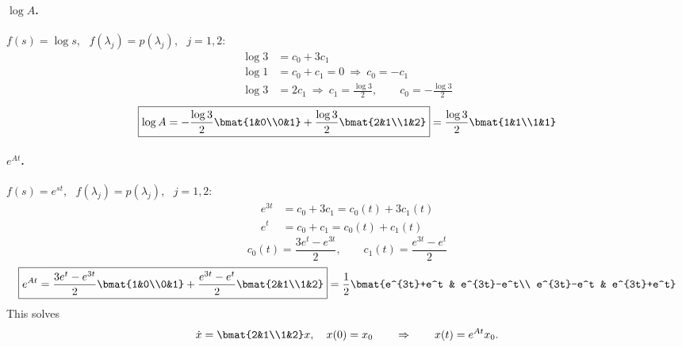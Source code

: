 \begin{example}
\paragraph{$\log A$.} $f(s) = \log s$, \ $f(\lambda_j) = p(\lambda_j)$, \ $j = 1,2$:
\begin{align*}
\log 3 &= c_0 + 3c_1\\
\log 1 &= c_0 + c_1 = 0 \ \Rightarrow\ c_0 = -c_1 \\ %
\log 3 &= 2c_1 \ \Rightarrow\ c_1 = \frac{\log 3}{2}, \qquad c_0 = -\frac{\log 3}{2} %
\end{align*}
\[
\boxed{\log A = -\frac{\log 3}{2}\bmat{1&0\\0&1} + \frac{\log 3}{2}\bmat{2&1\\1&2}}
= \frac{\log 3}{2}\bmat{1&1\\1&1}
\]

\paragraph{$e^{At}$.} $f(s) = e^{st}$, \ $f(\lambda_j) = p(\lambda_j)$, \ $j = 1,2$:
\begin{align*}
e^{3t} &= c_0 + 3c_1 = c_0(t) + 3c_1(t)\\
e^{t} &= c_0 + c_1 = c_0(t) + c_1(t)
\end{align*}
\[
c_0(t) = \frac{3e^t - e^{3t}}{2}, \qquad c_1(t) = \frac{e^{3t}-e^t}{2}
\]
\[
\boxed{e^{At} = \frac{3e^t-e^{3t}}{2}\bmat{1&0\\0&1} + \frac{e^{3t}-e^t}{2}\bmat{2&1\\1&2}}
= \frac12\bmat{e^{3t}+e^t & e^{3t}-e^t\\ e^{3t}-e^t & e^{3t}+e^t}
\]
This solves
\[
\dot{x} = \bmat{2&1\\1&2}x,\quad x(0)=x_0
\qquad\Rightarrow\qquad x(t) = e^{At}x_0 .
\]
\end{example}

